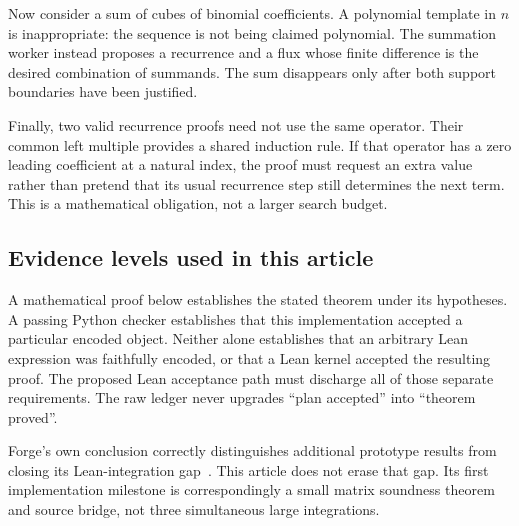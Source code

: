 Now consider a sum of cubes of binomial coefficients. A polynomial template in
$n$ is inappropriate: the sequence is not being claimed polynomial. The
summation worker instead proposes a recurrence and a flux whose finite
difference is the desired combination of summands. The sum disappears only
after both support boundaries have been justified.

Finally, two valid recurrence proofs need not use the same operator. Their
common left multiple provides a shared induction rule. If that operator has a
zero leading coefficient at a natural index, the proof must request an extra
value rather than pretend that its usual recurrence step still determines the
next term. This is a mathematical obligation, not a larger search budget.

\subsection{Evidence levels used in this article}


A mathematical proof below establishes the stated theorem under its hypotheses.
A passing Python checker establishes that this implementation accepted a
particular encoded object. Neither alone establishes that an arbitrary Lean
expression was faithfully encoded, or that a Lean kernel accepted the resulting
proof. The proposed Lean acceptance path must discharge all of those separate
requirements. The raw ledger never upgrades ``plan accepted'' into ``theorem
proved''.

Forge's own conclusion correctly distinguishes additional prototype results
from closing its Lean-integration gap~\cite{forge-conclusion}. This article does
not erase that gap. Its first implementation milestone is correspondingly a
small matrix soundness theorem and source bridge, not three simultaneous large
integrations.
